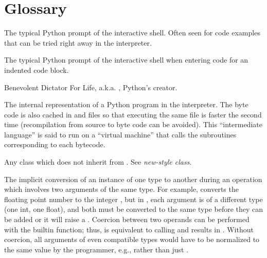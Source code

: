 \chapter{Glossary\label{glossary}}


\begin{description}


\index{>>>}
\item[\code{>\code{>}>}]
The typical Python prompt of the interactive shell.  Often seen for
code examples that can be tried right away in the interpreter.

\item[\code{.\code{.}.}]
The typical Python prompt of the interactive shell when entering code
for an indented code block.

\item[BDFL]
Benevolent Dictator For Life, a.k.a. , Python's creator.

\item[byte code]
The internal representation of a Python program in the interpreter.
The byte code is also cached in  and 
files so that executing the same file is faster the second time
(recompilation from source to byte code can be avoided).  This
``intermediate language'' is said to run on a ``virtual
machine'' that calls the subroutines corresponding to each bytecode.

\item[classic class]
Any class which does not inherit from .  See
\emph{new-style class}.

\item[coercion]
The implicit conversion of an instance of one type to another during an
operation which involves two arguments of the same type.  For example,
{} converts the floating point number to the integer
{}, but in {}, each argument is of a different type (one
int, one float), and both must be converted to the same type before they can
be added or it will raise a {}.  Coercion between two
operands can be performed with the {} builtin function; thus,
{} is equivalent to calling {} and results in {}.  Without coercion,
all arguments of even compatible types would have to be normalized to the
same value by the programmer, e.g., {} rather than just
{}.


\end{description}

